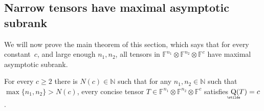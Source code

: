 \documentclass{daj}
\DeclareMathOperator{\asympsubrank}{\underaccent{\wtilde}{Q}}
\newcommand{\FF}{\mathbb{F}}
\newcommand{\NN}{\mathbb{N}}
\begin{document}
%
%
%
%

%

%
    
%




%
%
    
%
%
    
%
    
%
%
%
%
%
%
%
%
%
%
%
%

%
%
%
%

%
%
%

%
    
%
%
%
%
%
%
%
%
%
%
%
%
%
%

%
%
%
%


\subsection{Narrow tensors have maximal asymptotic subrank}
\label{sec:narrow}\label{subsec:main-unb}



%

%


%
We will now %
%
prove the main theorem of this section, which says that for every constant~$c$, and large enough $n_1, n_2$, all tensors in $\FF^{n_1} \otimes \FF^{n_2} \otimes \FF^{c}$ have maximal asymptotic subrank.

\begin{theorem}%
\label{theorem:concise-cn1n2-assubrank-c}
    For every $c\geq2$ there is $N(c)\in\mathbb{N}$ such that for any $n_1,n_2\in\NN$ such that $\max\{n_1,n_2\}>N(c)$, every concise tensor $T\in\mathbb{F}^{n_1}\otimes\mathbb{F}^{n_2}\otimes\mathbb{F}^c$ satisfies $\asympsubrank(T)=c$.
\end{theorem}






%

\end{document}
